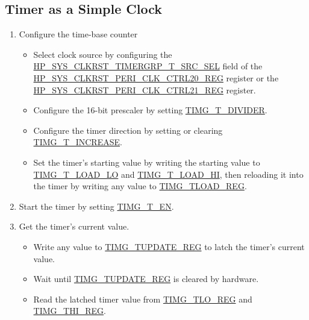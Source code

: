 \documentclass[main\_\_EN.tex]{subfiles}
\begin{document}
\subsection{Timer as a Simple Clock}\label{sec:timg-func-descr-simple-clock}
\begin{enumerate}
    \item Configure the time-base counter
    \begin{itemize}
        \item Select clock source by configuring the \hyperref[fielddesc:HPSYSCLKRSTTIMERGRP0T0SRCSEL]{HP\_SYS\_CLKRST\_TIMERGRP\_T\_SRC\_SEL} field of the \hyperref[regdesc:HPSYSCLKRSTPERICLKCTRL20REG]{HP\_SYS\_CLKRST\_PERI\_CLK\_CTRL20\_REG} register or the \hyperref[regdesc:HPSYSCLKRSTPERICLKCTRL21REG]{HP\_SYS\_CLKRST\_PERI\_CLK\_CTRL21\_REG} register.
        \item Configure the 16-bit prescaler by setting \hyperref[fielddesc:TIMGTXDIVIDER]{TIMG\_T\_DIVIDER}.
        \item Configure the timer direction by setting or clearing \hyperref[fielddesc:TIMGTXINCREASE]{TIMG\_T\_INCREASE}.
        \item Set the timer's starting value by writing the starting value to \hyperref[fielddesc:TIMGTXLOADLO]{TIMG\_T\_LOAD\_LO} and \hyperref[fielddesc:TIMGTXLOADHI]{TIMG\_T\_LOAD\_HI}, then reloading it into the timer by writing any value to \hyperref[regdesc:TIMGTXLOADREG]{TIMG\_TLOAD\_REG}.
    \end{itemize}
    \item Start the timer by setting \hyperref[fielddesc:TIMGTXEN]{TIMG\_T\_EN}.
    \item Get the timer's current value.
    \begin{itemize}
        \item  Write any value to \hyperref[regdesc:TIMGTXUPDATEREG]{TIMG\_TUPDATE\_REG} to latch the timer's current value.
        \item Wait until \hyperref[regdesc:TIMGTXUPDATEREG]{TIMG\_TUPDATE\_REG} is cleared by hardware.
        \item  Read the latched timer value from \hyperref[regdesc:TIMGTXLOREG]{TIMG\_TLO\_REG} and \hyperref[regdesc:TIMGTXHIREG]{TIMG\_THI\_REG}.
    \end{itemize}
\end{enumerate}
\end{document}
